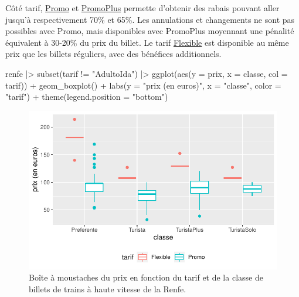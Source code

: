 \documentclass[
  11pt,
  letterpaper,
]{scrbook}
\newenvironment{Shaded}{\begin{snugshade}}{\end{snugshade}}
\newcommand{\AttributeTok}[1]{\textcolor[rgb]{0.40,0.45,0.13}{#1}}
\newcommand{\FunctionTok}[1]{\textcolor[rgb]{0.28,0.35,0.67}{#1}}
\newcommand{\NormalTok}[1]{\textcolor[rgb]{0.00,0.23,0.31}{#1}}
\newcommand{\SpecialCharTok}[1]{\textcolor[rgb]{0.37,0.37,0.37}{#1}}
\newcommand{\StringTok}[1]{\textcolor[rgb]{0.13,0.47,0.30}{#1}}
\theoremstyle{definition}
\theoremstyle{remark}
\begin{document}
Côté tarif,
\href{http://web.archive.org/web/20161111134241/http://www.renfe.com/viajeros/tarifas/billete_promo.html}{Promo}
et
\href{http://web.archive.org/web/20161110220249/http://www.renfe.com/viajeros/tarifas/billete_promoplus.html}{PromoPlus}
permette d'obtenir des rabais pouvant aller jusqu'à respectivement 70\%
et 65\%. Les annulations et changements ne sont pas possibles avec
Promo, mais disponibles avec PromoPlus moyennant une pénalité équivalent
à 30-20\% du prix du billet. Le tarif
\href{http://web.archive.org/web/20161108192609/http://www.renfe.com/viajeros/tarifas/billete_flexible.html}{Flexible}
est disponible au même prix que les billets réguliers, avec des
bénéfices additionnels.

\begin{Shaded}
\begin{Highlighting}[]
\NormalTok{renfe }\SpecialCharTok{|\textgreater{}} 
  \FunctionTok{subset}\NormalTok{(tarif  }\SpecialCharTok{!=} \StringTok{"AdultoIda"}\NormalTok{) }\SpecialCharTok{|\textgreater{}}
  \FunctionTok{ggplot}\NormalTok{(}\FunctionTok{aes}\NormalTok{(}\AttributeTok{y =}\NormalTok{ prix, }
             \AttributeTok{x =}\NormalTok{ classe, }
             \AttributeTok{col =}\NormalTok{ tarif)) }\SpecialCharTok{+} 
    \FunctionTok{geom\_boxplot}\NormalTok{() }\SpecialCharTok{+} 
    \FunctionTok{labs}\NormalTok{(}\AttributeTok{y =} \StringTok{"prix (en euros)"}\NormalTok{,}
         \AttributeTok{x =} \StringTok{"classe"}\NormalTok{,}
         \AttributeTok{color =} \StringTok{"tarif"}\NormalTok{) }\SpecialCharTok{+}
    \FunctionTok{theme}\NormalTok{(}\AttributeTok{legend.position =} \StringTok{"bottom"}\NormalTok{)}
\end{Highlighting}
\end{Shaded}

\begin{figure}[ht!]

{\centering \includegraphics[width=1\textwidth,height=\textheight]{analyseexploratoire_files/figure-pdf/fig-renfe-aed6-1.pdf}

}

\caption{\label{fig-renfe-aed6}Boîte à moustaches du prix en fonction du
tarif et de la classe de billets de trains à haute vitesse de la Renfe.}

\end{figure}
\end{document}
